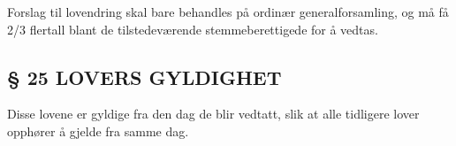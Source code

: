 Forslag til lovendring skal bare behandles på ordinær
generalforsamling, og må få 2/3 flertall blant de tilstedeværende
stemmeberettigede for å vedtas.


\subsection*{§ 25 LOVERS GYLDIGHET}

Disse lovene er gyldige fra den dag de blir vedtatt, slik at alle
tidligere lover opphører å gjelde fra samme dag.



